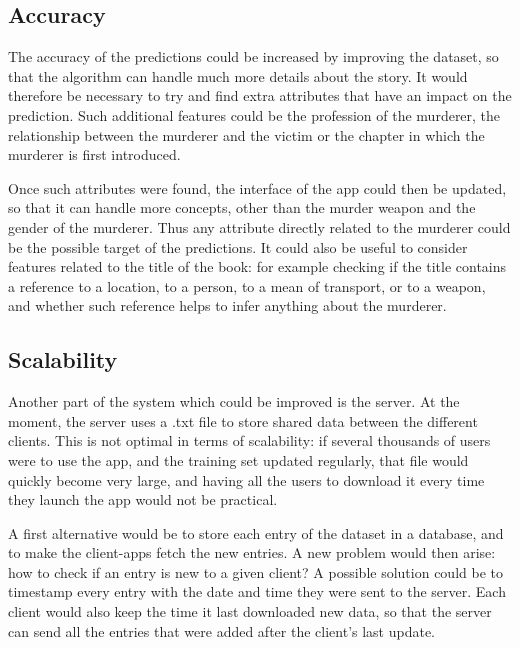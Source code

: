 \documentclass{mproj}
\begin{document}
\subsection{Accuracy}

The accuracy of the predictions could be increased by improving the dataset, so that the algorithm can handle much more details about the story. It would therefore be necessary to try and find extra attributes that have an impact on the prediction. Such additional features could be the profession of the murderer, the relationship between the murderer and the victim or the chapter in which the murderer is first introduced. \par

Once such attributes were found, the interface of the app could then be updated, so that it can handle more concepts, other than the murder weapon and the gender of the murderer. Thus any attribute directly related to the murderer could be the possible target of the predictions.
It could also be useful to consider features related to the title of the book: for example checking if the title contains a reference to a location, to a person, to a mean of transport, or to a weapon, and whether such reference helps to infer anything about the murderer.
	
\subsection{Scalability}

Another part of the system which could be improved is the server. At the moment, the server uses a .txt file to store shared data between the different clients. This is not optimal in terms of scalability: if several thousands of users were to use the app, and the training set updated regularly, that file would quickly become very large, and having all the users to download it every time they launch the app would not be practical. \par

A first alternative would be to store each entry of the dataset in a database, and to make the client-apps fetch the new entries. A new problem would then arise: how to check if an entry is new to a given client? A possible solution could be to timestamp every entry with the date and time they were sent to the server. Each client would also keep the time it last downloaded new data, so that the server can send all the entries that were added after the client's last update. \par
\end{document}
